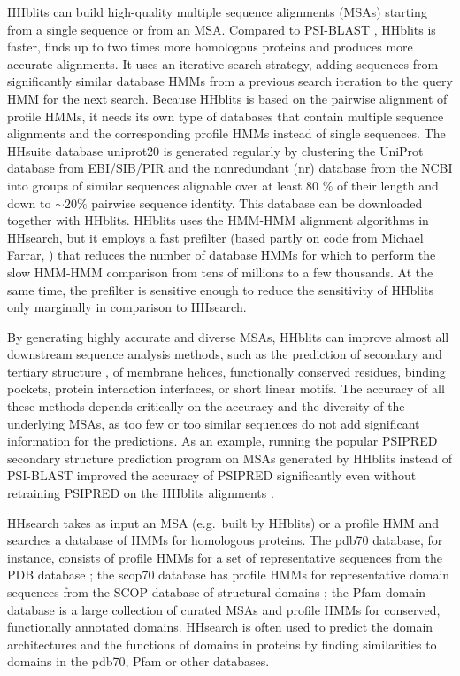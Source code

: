 \documentclass[11pt,a4paper]{article}
\begin{document}
HHblits can build high-quality multiple sequence alignments (MSAs) starting from a single sequence or from an MSA. Compared to PSI-BLAST \cite{Altschul:1997}, HHblits is faster, finds up to two times more homologous proteins and produces more accurate alignments. It uses an iterative search strategy, adding sequences from significantly similar database HMMs from a previous search iteration to the query HMM for the next search. Because HHblits is based on the pairwise alignment of profile HMMs, it needs its own type of databases that contain multiple sequence alignments and the corresponding profile HMMs instead of single sequences. The HHsuite database uniprot20 is generated regularly by clustering the UniProt database \cite{uniprot:2010} from EBI/SIB/PIR and the nonredundant (nr) database from the NCBI into groups of similar sequences alignable over at least 80 \% of their length and down to $\sim 20 \%$ pairwise sequence identity. This database can be downloaded together with HHblits. HHblits uses the HMM-HMM alignment algorithms in HHsearch, but it employs a fast prefilter (based partly on code from Michael Farrar, \cite{Farrar:2007}) that reduces the number of database HMMs for which to perform the slow HMM-HMM comparison from tens of millions to a few thousands. At the same time, the prefilter is sensitive enough to reduce the sensitivity of HHblits only marginally in comparison to HHsearch. 

By generating highly accurate and diverse MSAs, HHblits can improve almost all downstream sequence analysis methods, such as the prediction of secondary and tertiary structure \cite{Jones:1999, Marks:2011}, of membrane helices, functionally conserved residues, binding pockets, protein interaction interfaces, or short linear motifs. The accuracy of all these methods depends critically on the accuracy and the diversity of the underlying MSAs, as too few or too similar sequences do not add significant information for the predictions. As an example, running the popular PSIPRED secondary structure prediction program \cite{Jones:1999} on MSAs generated by HHblits instead of PSI-BLAST improved the accuracy of PSIPRED significantly even without retraining PSIPRED on the HHblits alignments \cite{Remmert:2011}. 

HHsearch takes as input an MSA (e.g.\ built by HHblits) or a profile HMM and searches a database of HMMs for homologous proteins. The pdb70 database, for instance, consists of profile HMMs for a set of representative sequences from the PDB database \cite{PDB:2004}; the scop70 database has profile HMMs for representative domain sequences from the SCOP database of structural domains \cite{SCOP:2000}; the Pfam \cite{Finn:2010} domain database is a large collection of curated MSAs and profile HMMs for conserved, functionally annotated domains. HHsearch is often used to predict the domain architectures and the functions of domains in proteins by finding similarities to domains in the pdb70, Pfam or other databases. 
\end{document}

